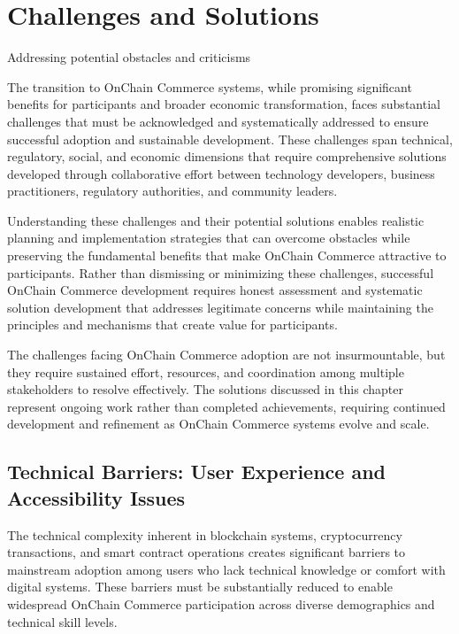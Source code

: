 \documentclass[
  Letterpaper,
]{scrbook}
\begin{document}
\chapter{Challenges and Solutions}\label{sec-challenges-solutions}

Addressing potential obstacles and criticisms

The transition to OnChain Commerce systems, while promising significant
benefits for participants and broader economic transformation, faces
substantial challenges that must be acknowledged and systematically
addressed to ensure successful adoption and sustainable development.
These challenges span technical, regulatory, social, and economic
dimensions that require comprehensive solutions developed through
collaborative effort between technology developers, business
practitioners, regulatory authorities, and community leaders.

Understanding these challenges and their potential solutions enables
realistic planning and implementation strategies that can overcome
obstacles while preserving the fundamental benefits that make OnChain
Commerce attractive to participants. Rather than dismissing or
minimizing these challenges, successful OnChain Commerce development
requires honest assessment and systematic solution development that
addresses legitimate concerns while maintaining the principles and
mechanisms that create value for participants.

The challenges facing OnChain Commerce adoption are not insurmountable,
but they require sustained effort, resources, and coordination among
multiple stakeholders to resolve effectively. The solutions discussed in
this chapter represent ongoing work rather than completed achievements,
requiring continued development and refinement as OnChain Commerce
systems evolve and scale.

\section{Technical Barriers: User Experience and Accessibility
Issues}\label{technical-barriers-user-experience-and-accessibility-issues}

The technical complexity inherent in blockchain systems, cryptocurrency
transactions, and smart contract operations creates significant barriers
to mainstream adoption among users who lack technical knowledge or
comfort with digital systems. These barriers must be substantially
reduced to enable widespread OnChain Commerce participation across
diverse demographics and technical skill levels.
\end{document}
